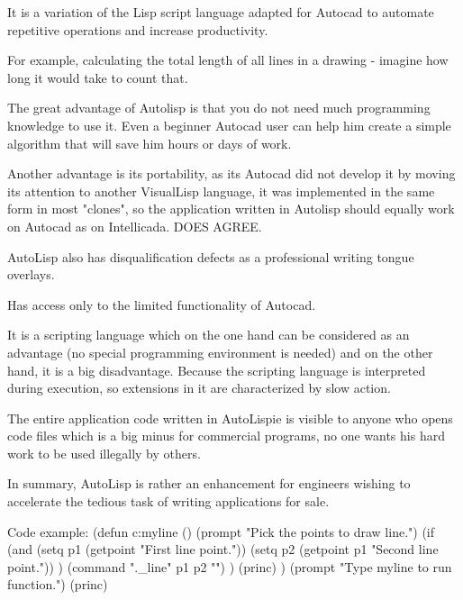 \documentclass[a4paper, 11pt, article]{report}
\begin{document}
It is a variation of the Lisp script language adapted for Autocad to automate repetitive operations and increase productivity.

For example, calculating the total length of all lines in a drawing - imagine how long it would take to count that.

The great advantage of Autolisp is that you do not need much programming knowledge to use it. Even a beginner Autocad user can help him create a simple algorithm that will save him hours or days of work.

Another advantage is its portability, as its Autocad did not develop it by moving its attention to another VisualLisp language, it was implemented in the same form in most "clones", so the application written in Autolisp should equally work on Autocad as on Intellicada. DOES AGREE.

AutoLisp also has disqualification defects as a professional writing tongue overlays.

Has access only to the limited functionality of Autocad.

It is a scripting language which on the one hand can be considered as an advantage (no special programming environment is needed) and on the other hand, it is a big disadvantage. Because the scripting language is interpreted during execution, so extensions in it are characterized by slow action.

The entire application code written in AutoLispie is visible to anyone who opens code files which is a big minus for commercial programs, no one wants his hard work to be used illegally by others.

In summary, AutoLisp is rather an enhancement for engineers wishing to accelerate the tedious task of writing applications for sale.


Code example:
\newline
\newline
[code language="cpp"] (defun c:myline () \newline
(prompt "Pick the points to draw line.") \newline
(if (and (setq p1 (getpoint "First line point.")) \newline
(setq p2 (getpoint p1 "Second line point.")) \newline
) \newline
(command "._line" p1 p2 "") \newline
) \newline
(princ) \newline
) \newline
(prompt "Type myline to run function.") \newline
(princ) \newline
[/code] \newline
\end{document}
